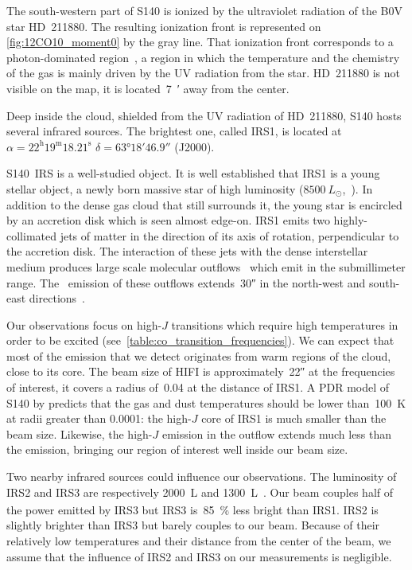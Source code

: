 The south-western part of S140 is ionized by the ultraviolet radiation of the B0V star HD~211880.
The resulting ionization front is represented on \cref{fig:12CO10_moment0} by the gray line.
That ionization front corresponds to a photon-dominated region~\parencite{hollenbach1997dense}, a region in which the temperature and the chemistry of the gas is mainly driven by the UV radiation from the star.
HD~211880 is not visible on the map, it is located~\SI{7}{\arcmin} away from the center.

Deep inside the cloud, shielded from the UV radiation of HD~211880, S140 hosts several infrared sources.
The brightest one, called IRS1, is located at $\alpha = 22^\text{h} 19^\text{m} 18.21^\text{s}$ $\delta = \ang{63;18;46.9}$ (J2000).

S140~IRS is a well-studied object.
It is well established that IRS1 is a young stellar object, a newly born massive star of high luminosity ($\SI{8500}{L_\odot}$,~\cite{maud2013s140}).
In addition to the dense gas cloud that still surrounds it, the young star is encircled by an accretion disk which is seen almost edge-on.
IRS1 emits two highly-collimated jets of matter in the direction of its axis of rotation, perpendicular to the accretion disk.
The interaction of these jets with the dense interstellar medium produces large scale molecular outflows~\parencite{reipurth2001herbig} which emit in the submillimeter range.
The~ emission of these outflows extends~\ang{;;30} in the north-west and south-east directions~\parencite{maud2013s140}.

Our observations focus on high-$J$ transitions which require high temperatures in order to be excited (see~\cref{table:co_transition_frequencies}).
We can expect that most of the emission that we detect originates from warm regions of the cloud, close to its core.
The beam size of HIFI is approximately~\ang{;;22} at the frequencies of interest,
it covers a radius of~\SI{0.04}{\parsec} at the distance of IRS1.
A PDR model of S140 by \textcite{koumpia2015} predicts that the gas and dust temperatures should be lower than~\SI{100}{\kelvin} at radii greater than \SI{0.0001}{\parsec}: the high-$J$  core of IRS1 is much smaller than the beam size.
Likewise, the high-$J$  emission in the outflow extends much less than the  emission, bringing our region of interest well inside our beam size.

Two nearby infrared sources could influence our observations.
The luminosity of IRS2 and IRS3 are respectively \SI{2000}{L_\odot} and \SI{1300}{L_\odot}~\parencite{koumpia2015}.
Our beam couples half of the power emitted by IRS3 but IRS3 is~\SI{85}{\percent} less bright than IRS1.
IRS2 is slightly brighter than IRS3 but barely couples to our beam.
Because of their relatively low temperatures and their distance from the center of the beam, we assume that the influence of IRS2 and IRS3 on our measurements is negligible.

